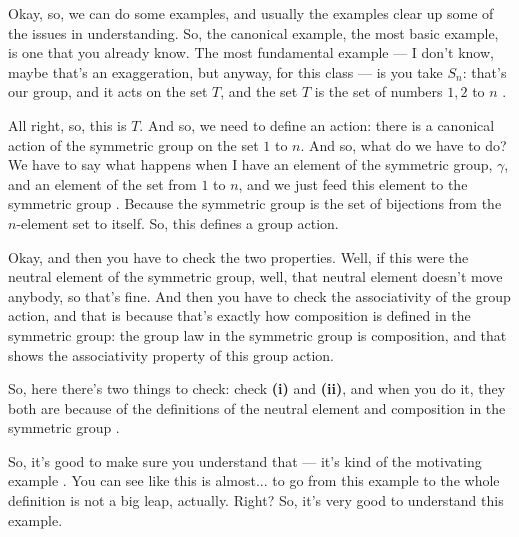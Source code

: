 \begin{speech}[00:53:26 - 00:55:37]
Okay, so, we can do some examples, and usually the examples clear up some of the issues in understanding. So, the canonical example, the most basic example, is one that you already know. The most fundamental example --- I don't know, maybe that's an exaggeration, but anyway, for this class --- is you take $S_n$: that's our group, and it acts on the set $T$, and the set $T$ is the set of numbers $1, 2$ to $n$ .

All right, so, this is $T$. And so, we need to define an action: there is a canonical action of the symmetric group on the set $1$ to $n$. And so, what do we have to do? We have to say what happens when I have an element of the symmetric group, $\gamma$, and an element of the set from $1$ to $n$, and we just feed this element to the symmetric group . Because the symmetric group is the set of bijections from the $n$-element set to itself. So, this defines a group action.

Okay, and then you have to check the two properties. Well, if this were the neutral element of the symmetric group, well, that neutral element doesn't move anybody, so that's fine. And then you have to check the associativity of the group action, and that is because that's exactly how composition is defined in the symmetric group: the group law in the symmetric group is composition, and that shows the associativity property of this group action.

So, here there's two things to check: check \textbf{(i)} and \textbf{(ii)}, and when you do it, they both are because of the definitions of the neutral element and composition in the symmetric group .

So, it's good to make sure you understand that --- it's kind of the motivating example . You can see like this is almost... to go from this example to the whole definition is not a big leap, actually. Right? So, it's very good to understand this example.
\end{speech}


